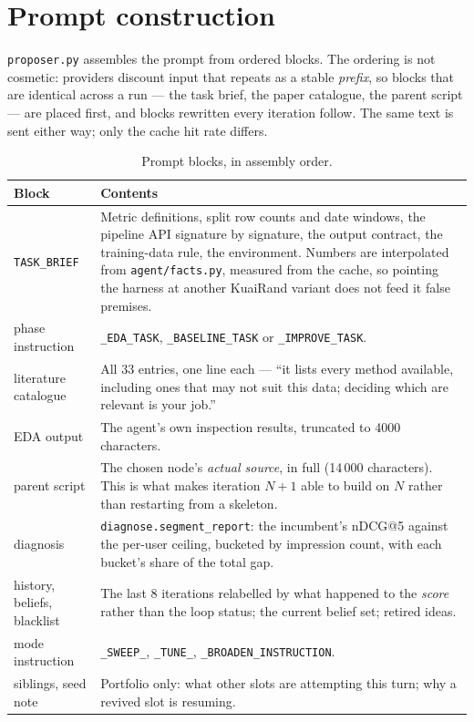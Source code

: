 \documentclass[11pt,a4paper]{article}
\newcommand{\code}[1]{\texttt{#1}}
\newcommand{\file}[1]{\texttt{#1}}
\begin{document}
\section{Prompt construction}

\file{proposer.py} assembles the prompt from ordered blocks. The ordering is not cosmetic:
providers discount input that repeats as a stable \emph{prefix}, so blocks that are identical
across a run --- the task brief, the paper catalogue, the parent script --- are placed first, and
blocks rewritten every iteration follow. The same text is sent either way; only the cache hit
rate differs.

\begin{table}[htbp]
\centering
\small
\begin{tabular}{@{}p{4.2cm}p{10.6cm}@{}}
\toprule
\textbf{Block} & \textbf{Contents} \\
\midrule
\code{TASK\_BRIEF} & Metric definitions, split row counts and date windows, the pipeline API
  signature by signature, the output contract, the training-data rule, the environment. Numbers
  are interpolated from \file{agent/facts.py}, measured from the cache, so pointing the harness at
  another KuaiRand variant does not feed it false premises. \\
phase instruction & \code{\_EDA\_TASK}, \code{\_BASELINE\_TASK} or \code{\_IMPROVE\_TASK}. \\
literature catalogue & All 33 entries, one line each --- ``it lists every method available,
  including ones that may not suit this data; deciding which are relevant is your job.'' \\
EDA output & The agent's own inspection results, truncated to 4000 characters. \\
parent script & The chosen node's \emph{actual source}, in full (14\,000 characters). This is
  what makes iteration $N{+}1$ able to build on $N$ rather than restarting from a skeleton. \\
diagnosis & \code{diagnose.segment\_report}: the incumbent's nDCG@5 against the per-user ceiling,
  bucketed by impression count, with each bucket's share of the total gap. \\
history, beliefs, blacklist & The last 8 iterations relabelled by what happened to the
  \emph{score} rather than the loop status; the current belief set; retired ideas. \\
mode instruction & \code{\_SWEEP\_}, \code{\_TUNE\_}, \code{\_BROADEN\_INSTRUCTION}. \\
siblings, seed note & Portfolio only: what other slots are attempting this turn; why a revived
  slot is resuming. \\
\bottomrule
\end{tabular}
\caption{Prompt blocks, in assembly order.}
\end{table}
\end{document}
